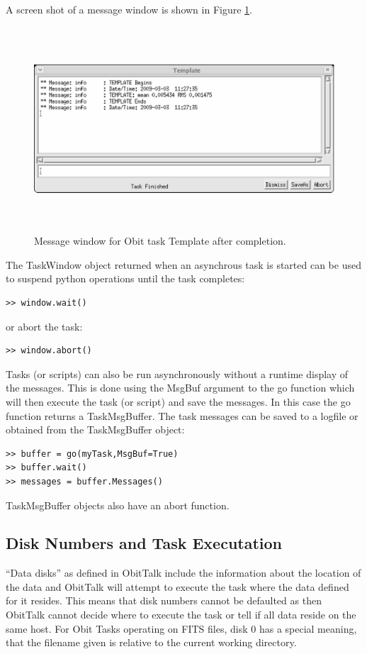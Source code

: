 \documentclass[11pt]{report}
\begin{document}
A screen shot of a message window is shown in Figure
\ref{MessWinFig}.
\begin{figure}
\centering
\includegraphics[height=3in]{ObitMessScreen.eps}
\caption{ 
Message window for Obit task Template after completion.
}
\label{MessWinFig}
\end{figure}

The TaskWindow object returned when an asynchrous task is started can
be used to suspend python operations until the task completes:
\begin{verbatim}
>> window.wait()
\end{verbatim}
or abort the task:
\begin{verbatim}
>> window.abort()
\end{verbatim}

Tasks (or scripts) can also be run asynchronously without a runtime
display of the messages.
This is done using the  MsgBuf argument to the go function which will then
execute the task (or script) and save the messages.
In this case the go function returns a TaskMsgBuffer.
The task messages can be saved to a logfile or obtained from the 
TaskMsgBuffer object:
\begin{verbatim}
>> buffer = go(myTask,MsgBuf=True)
>> buffer.wait()
>> messages = buffer.Messages()
\end{verbatim}
TaskMsgBuffer objects also have an abort function.

\subsection{Disk Numbers and Task Executation \label{Disks}}
``Data disks'' as defined in ObitTalk include the information about
the location of the data and ObitTalk will attempt to execute the task
where the data defined for it resides.
This means that disk numbers cannot be defaulted as then ObitTalk
cannot decide where to execute the task or tell if all data reside on
the same host.
For Obit Tasks operating on FITS files, disk 0 has a special meaning,
that the filename given is relative to the current working directory.
\end{document}
